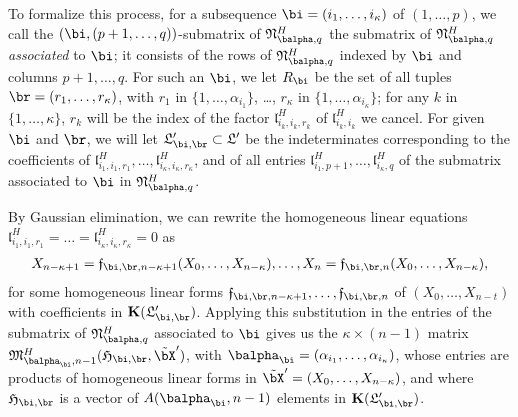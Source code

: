 \documentclass[12pt]{article}
\begin{document}
To formalize this process, for a subsequence
$\bi=(i_1,\dots,i_\kappa)$ of $(1,\dots,p)$, we call the
$(\bi,(p+1,\dots,q))$-submatrix of $\mathfrak{N}^H_{\balpha,q}$ the submatrix of
$\mathfrak{N}^H_{\balpha,q}$ {\em associated} to $\bi$; it consists of the rows of
$\mathfrak{N}^H_{\balpha,q}$ indexed by $\bi$ and columns $p+1,\dots,q$.
For such an $\bi$, we let $R_\bi$ be the set of
all tuples $\br=(r_1,\dots,r_\kappa)$, with $r_1$ in
$\{1,\dots,\alpha_{i_1}\}$, \dots, $r_\kappa$ in
$\{1,\dots,\alpha_{i_\kappa}\}$; for any $k$ in $\{1,\dots,\kappa\}$,
$r_k$ will be the index of the factor $\mathfrak{l}^H_{i_k,i_k,r_k}$
of $\mathfrak{l}^H_{i_k,i_k}$ we cancel. For given $\bi$ and $\br$,
we will let $\mathfrak{L}'_{\bi,\br} \subset \mathfrak{L}'$ be the
indeterminates corresponding to the coefficients of
$\mathfrak{l}^H_{i_1,i_1,r_1},\dots,\mathfrak{l}^H_{i_\kappa,i_\kappa,r_\kappa}$, and
of all entries $\mathfrak{l}^H_{i_1,p+1},\dots,\mathfrak{l}^H_{i_\kappa,q}$
of the submatrix associated to $\bi$ in $\mathfrak{N}^H_{\balpha,q}$.

By Gaussian elimination, we can rewrite the homogeneous linear
equations
$\mathfrak{l}^H_{i_1,i_1,r_1}=\dots=\mathfrak{l}^H_{i_\kappa,i_\kappa,r_\kappa}=0$ as
\begin{align}\label{eq:f_sr}
X_{n-\kappa+1}=\mathfrak{f}_{\bi,\br,n-\kappa+1}(X_0,\dots,X_{n-\kappa}),\dots,X_{n}=\mathfrak{f}_{\bi,\br,n}(X_0,\dots,X_{n-\kappa}),  
\end{align}
for some homogeneous linear forms
$\mathfrak{f}_{\bi,\br,n-\kappa+1},\dots,\mathfrak{f}_{\bi,\br,n}$ of
$(X_0,\dots,X_{n-t})$ with coefficients in
$\KK(\mathfrak{L}'_{\bi,\br})$. Applying this substitution in the
entries of the submatrix of ${\mathfrak{N}^H_{\balpha,q}}$ associated
to $\bi$ gives us the $\kappa \times (n-1)$ matrix
$\mathfrak{M}^H_{\balpha_\bi,n-1}(\mathfrak{H}_{\bi,\br},\tilde\bX')$,
with $\balpha_\bi=(\alpha_{i_1},\dots,\alpha_{i_\kappa})$, whose
entries are products of homogeneous linear forms in
$\tilde\bX'=(X_0,\dots,X_{n-\kappa})$, and where $\mathfrak{H}_{\bi,\br}$ is a
vector of $A(\balpha_\bi,n-1)$ elements in $\KK(\mathfrak{L}'_{\bi,\br})$.
\end{document}
